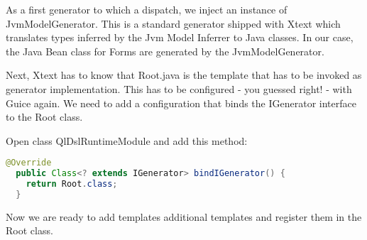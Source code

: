 As a first generator to which a dispatch, we inject an instance of
JvmModelGenerator. This is a standard generator shipped with Xtext which
translates types inferred by the Jvm Model Inferrer to Java classes.
In our case, the Java Bean class for Forms are generated by the
JvmModelGenerator. 
 
Next, Xtext has to know that Root.java is the template that has to be invoked
as generator implementation. This has to be configured - you guessed right! - 
with Guice again. We need to add a configuration that binds the IGenerator
interface to the Root class.

Open class QlDslRuntimeModule and add this method:

\begin{lstlisting}[language=Java]
  @Override
  public Class<? extends IGenerator> bindIGenerator() {
    return Root.class;
  }
\end{lstlisting}

Now we are ready to add templates additional templates and register them in the
Root class.
